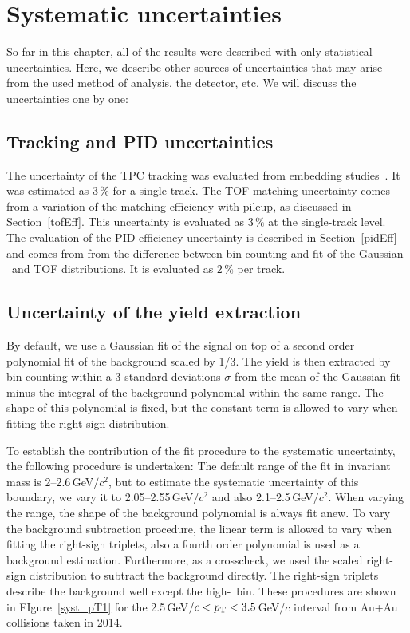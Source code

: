 \section{Systematic uncertainties}

So far in this chapter, all of the results were described with only statistical uncertainties. Here, we describe other sources of uncertainties that may arise from the used method of analysis, the detector, etc. We will discuss the uncertainties one by one:

\subsection{Tracking and PID uncertainties}
The uncertainty of the TPC tracking was evaluated from embedding studies~\cite{D0paper}. It was estimated as 3$\,\%$ for a single track. The TOF-matching uncertainty comes from a variation of the matching efficiency with pileup, as discussed in Section~\ref{tofEff}\@. This uncertainty is evaluated as 3$\,\%$ at the single-track level. The evaluation of the PID efficiency uncertainty is described in Section~\ref{pidEff} and comes from from the difference between bin counting and fit of the Gaussian \dedx\ and TOF distributions. It is evaluated as $2\,\%$ per track.


\subsection{Uncertainty of the yield extraction}
By default,  we use a Gaussian fit of the signal on top of a second order polynomial fit of the background scaled by 1/3\@. The yield is then extracted by bin counting within a 3 standard deviations $\sigma$ from the mean of the Gaussian fit minus the integral of the background polynomial within the same range. The shape of this polynomial is fixed, but the constant term is allowed to vary when fitting the right-sign distribution.

To establish the contribution of the fit procedure to the systematic uncertainty, the following procedure is undertaken: The default range of the fit in invariant mass is 2--2.6$\,$GeV$/c^2$, but to estimate the systematic uncertainty of this boundary, we vary it to  2.05--2.55$\,$GeV$/c^2$ and also 2.1--2.5$\,$GeV$/c^2$\@.  When varying the range, the shape of the background polynomial is always fit anew. To vary the background subtraction procedure, the linear term is allowed to vary when fitting the right-sign triplets, also a fourth order polynomial is used as a background estimation. Furthermore, as a crosscheck, we used the scaled right-sign distribution to subtract the background directly. The right-sign triplets describe the background well except the high-\pt\ bin. These procedures are shown in FIgure~\ref{syst_pT1} for the 2.5$\,$GeV$/c < {p_{\mathrm{T}}} < 3.5\,$GeV$/c$ interval from Au+Au collisions taken in 2014\@.

